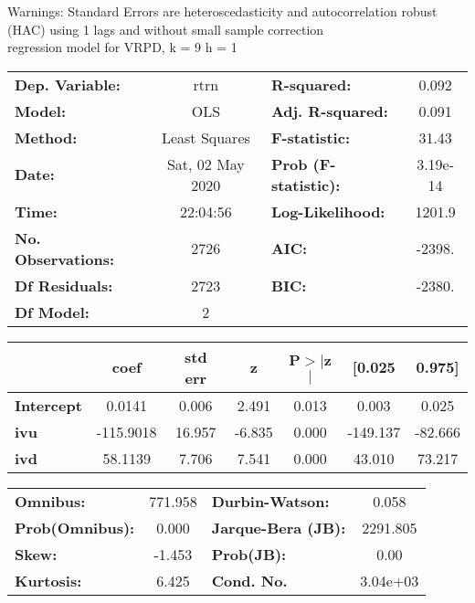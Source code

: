 Warnings: \newline
 [1] Standard Errors are heteroscedasticity and autocorrelation robust (HAC) using 1 lags and without small sample correction\\ 

regression model for VRPD, k = 9 h = 1\begin{center}
\begin{tabular}{lclc}
\toprule
\textbf{Dep. Variable:}    &       rtrn       & \textbf{  R-squared:         } &     0.092   \\
\textbf{Model:}            &       OLS        & \textbf{  Adj. R-squared:    } &     0.091   \\
\textbf{Method:}           &  Least Squares   & \textbf{  F-statistic:       } &     31.43   \\
\textbf{Date:}             & Sat, 02 May 2020 & \textbf{  Prob (F-statistic):} &  3.19e-14   \\
\textbf{Time:}             &     22:04:56     & \textbf{  Log-Likelihood:    } &    1201.9   \\
\textbf{No. Observations:} &        2726      & \textbf{  AIC:               } &    -2398.   \\
\textbf{Df Residuals:}     &        2723      & \textbf{  BIC:               } &    -2380.   \\
\textbf{Df Model:}         &           2      & \textbf{                     } &             \\
\bottomrule
\end{tabular}
\begin{tabular}{lcccccc}
                   & \textbf{coef} & \textbf{std err} & \textbf{z} & \textbf{P$> |$z$|$} & \textbf{[0.025} & \textbf{0.975]}  \\
\midrule
\textbf{Intercept} &       0.0141  &        0.006     &     2.491  &         0.013        &        0.003    &        0.025     \\
\textbf{ivu}       &    -115.9018  &       16.957     &    -6.835  &         0.000        &     -149.137    &      -82.666     \\
\textbf{ivd}       &      58.1139  &        7.706     &     7.541  &         0.000        &       43.010    &       73.217     \\
\bottomrule
\end{tabular}
\begin{tabular}{lclc}
\textbf{Omnibus:}       & 771.958 & \textbf{  Durbin-Watson:     } &    0.058  \\
\textbf{Prob(Omnibus):} &   0.000 & \textbf{  Jarque-Bera (JB):  } & 2291.805  \\
\textbf{Skew:}          &  -1.453 & \textbf{  Prob(JB):          } &     0.00  \\
\textbf{Kurtosis:}      &   6.425 & \textbf{  Cond. No.          } & 3.04e+03  \\
\bottomrule
\end{tabular}
\end{center}

